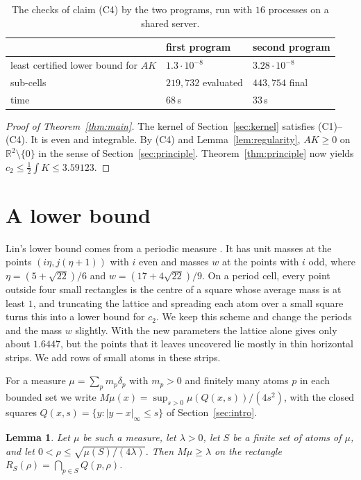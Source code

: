 \documentclass[11pt]{amsart}
\newtheorem{lemma}[equation]{Lemma}
\theoremstyle{definition}
\theoremstyle{remark}
\numberwithin{equation}{section}
\newcommand{\R}{\mathbb{R}}
\newcommand{\CBOUND}{3.59123}
\newcommand{\VAmin}{1.3\cdot10^{-8}}
\newcommand{\LBFRAME}{1.6447}
\begin{document}
\begin{table}[ht]
\caption{The checks of claim (C4) by the two programs, run with $16$ processes on a shared server.}\label{tab:verify}
\begin{tabular}{@{}lll@{}}
\toprule
 & first program & second program\\
\midrule
least certified lower bound for $AK$ & $\VAmin$ & $3.28\cdot10^{-8}$\\
sub-cells & $219{,}732$ evaluated & $443{,}754$ final\\
time & $68$\,s & $33$\,s\\
\bottomrule
\end{tabular}
\end{table}

\begin{proof}[Proof of Theorem~\ref{thm:main}]
The kernel of Section~\ref{sec:kernel} satisfies (C1)--(C4). It is even and integrable. By (C4) and Lemma~\ref{lem:regularity}, $AK\ge0$ on $\R^2\setminus\{0\}$ in the sense of Section~\ref{sec:principle}. Theorem~\ref{thm:principle} now yields $c_2\le\frac12\int K\le\CBOUND$.
\end{proof}

\section{A lower bound}\label{sec:lower}

Lin's lower bound comes from a periodic measure \cite{Lin26b}. It has unit masses at the points $(i\eta,j(\eta+1))$ with $i$ even and masses $w$ at the points with $i$ odd, where $\eta=(5+\sqrt{22})/6$ and $w=(17+4\sqrt{22})/9$. On a period cell, every point outside four small rectangles is the centre of a square whose average mass is at least $1$, and truncating the lattice and spreading each atom over a small square turns this into a lower bound for $c_2$. We keep this scheme and change the periods and the mass $w$ slightly. With the new parameters the lattice alone gives only about $\LBFRAME$, but the points that it leaves uncovered lie mostly in thin horizontal strips. We add rows of small atoms in these strips.

For a measure $\mu=\sum_pm_p\delta_p$ with $m_p>0$ and finitely many atoms $p$ in each bounded set we write $M\mu(x)=\sup_{s>0}\mu(Q(x,s))/(4s^2)$, with the closed squares $Q(x,s)=\{y:|y-x|_\infty\le s\}$ of Section~\ref{sec:intro}.

\begin{lemma}\label{lem:rect}
Let $\mu$ be such a measure, let $\lambda>0$, let $S$ be a finite set of atoms of $\mu$, and let $0<\rho\le\sqrt{\mu(S)/(4\lambda)}$. Then $M\mu\ge\lambda$ on the rectangle $R_S(\rho)=\bigcap_{p\in S}Q(p,\rho)$.
\end{lemma}
\end{document}
